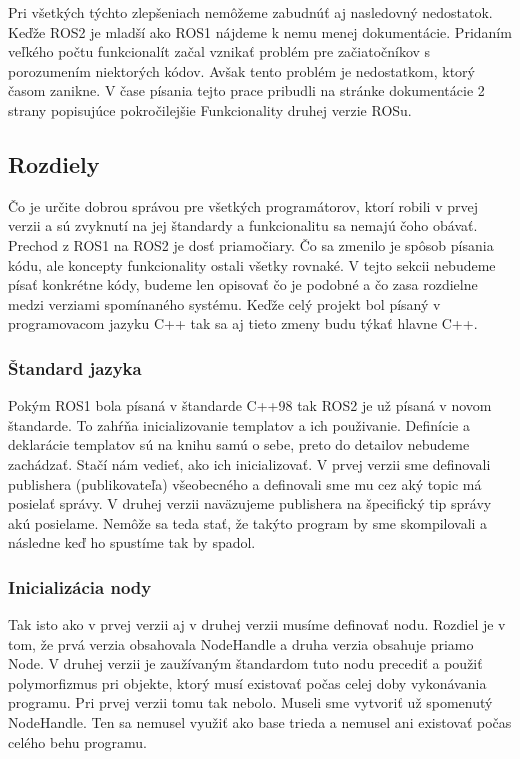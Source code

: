 Pri všetkých týchto zlepšeniach nemôžeme zabudnúť aj nasledovný nedostatok. Keďže ROS2 je mladší ako ROS1 nájdeme k nemu menej dokumentácie.
Pridaním veľkého počtu funkcionalít začal vznikať problém pre začiatočníkov s porozumením niektorých kódov. Avšak tento problém je nedostatkom,
ktorý časom zanikne. V čase písania tejto prace pribudli na stránke dokumentácie 2 strany popisujúce pokročilejšie Funkcionality druhej verzie ROSu.

\subsection{Rozdiely}

Čo je určite dobrou správou pre všetkých programátorov, ktorí robili v prvej verzii a sú zvyknutí na jej štandardy a funkcionalitu sa nemajú čoho obávať.
Prechod z ROS1 na ROS2 je dosť priamočiary. Čo sa zmenilo je spôsob písania kódu, ale koncepty funkcionality ostali všetky rovnaké. V tejto sekcii nebudeme
písať konkrétne kódy, budeme len opisovať čo je podobné a čo zasa rozdielne medzi verziami spomínaného systému. Keďže celý projekt bol písaný v programovacom
jazyku C++ tak sa aj tieto zmeny budu týkať hlavne C++.

\subsubsection{Štandard jazyka}

	Pokým ROS1 bola písaná v štandarde C++98 tak ROS2 je už písaná v novom štandarde. To zahŕňa inicializovanie templatov a ich použivanie. Definície
	a deklarácie templatov sú na knihu samú o sebe, preto do detailov nebudeme zachádzať. Stačí nám vedieť, ako ich inicializovať. V prvej verzii
	sme definovali publishera (publikovateľa) všeobecného a definovali sme mu cez aký topic má posielať správy. V druhej verzii naväzujeme publishera
	na špecifický tip správy akú posielame. Nemôže sa teda stať, že takýto program by sme skompilovali a následne keď ho spustíme tak by spadol.

\subsubsection{Inicializácia nody}

	Tak isto ako v prvej verzii aj v druhej verzii musíme definovať nodu. Rozdiel je v tom, že prvá verzia obsahovala NodeHandle a druha verzia obsahuje priamo Node.
	V druhej verzii je zaužívaným štandardom tuto nodu precediť a použiť polymorfizmus pri objekte, ktorý musí existovať počas celej doby vykonávania programu. Pri
	prvej verzii tomu tak nebolo. Museli sme vytvoriť už spomenutý NodeHandle. Ten sa nemusel využiť ako base trieda a nemusel ani existovať počas celého behu programu.

